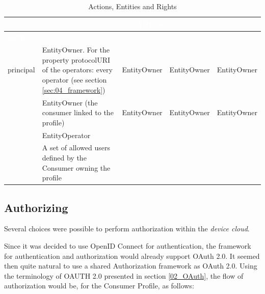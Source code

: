  \begin{table}[htpb]
 	\caption{Actions, Entities and Rights} 
 	\label{tab:access_control}
 	\begin{tabular}{|m{}|m{}|m{}|m{}|m{}|}
 		\hline
 		\cellcolor{Gray} & \multicolumn{4}{c}{\cellcolor{Gray}\textcolor{white}{\textbf{Actions}}}\\
 		\hline
 		\cellcolor{Gray}\textcolor{white}{\textbf{Entity}} 
 		&
 		\cellcolor{LightGray}{Read-Only}
 		&
 		\cellcolor{LightGray}{Read-Write}
 		&
 		\cellcolor{LightGray}{Create}
 		&
 		\cellcolor{LightGray}{Delete}
 		\\ \hline
 		
 		\cellcolor{LightGray}principal & \textbullet \quad EntityOwner. \linebreak \linebreak \textbullet \quad For the property protocolURI of the operators: every operator (see section \ref{sec:04_framework}) & EntityOwner & EntityOwner & EntityOwner
 		\\ \hline
 		\multirow{3}{*}{\cellcolor{LightGray}} & 
 		\multicolumn{1}{p{0.8\textwidth/9*2}|}{\textbullet \quad EntityOwner (the consumer linked to the profile)} & 
 		\multicolumn{1}{p{0.8\textwidth/9*2}|}{EntityOwner} &
 		\multicolumn{1}{p{0.8\textwidth/9*2}|}{EntityOwner} & 
 		\multicolumn{1}{p{0.8\textwidth/9*2}|}{EntityOwner} 
 		\\
 		\cellcolor{LightGray}consumer profile & 
 		\textbullet \quad EntityOperator & 
 		& 
 		& 
 		
 		\\
 		\cellcolor{LightGray} & 
 		\textbullet \quad A set of allowed users defined by the Consumer owning the profile &
 		& 
 		& 
 		
 		\\

 		\hline
 	\end{tabular}
 \end{table}


\subsection{Authorizing}
\label{03_consumer_profile_authorization}
Several choices were possible to perform authorization within the \emph{device cloud}.

Since it was decided to use OpenID Connect for authentication, the framework for authentication and authorization would already support OAuth 2.0. It seemed then quite natural to use a shared Authorization framework as OAuth 2.0. Using the terminology of OAUTH 2.0 presented in section \ref{02_OAuth}, the flow of authorization would be, for the Consumer Profile, as follows:

